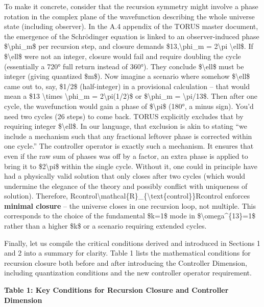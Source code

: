 \documentclass[]{article}
\begin{document}
{{To make it concrete, consider that the recursion symmetry might involve
a phase rotation in the complex plane of the wavefunction describing the
whole universe state (including observer). In the A.4 appendix of the
TORUS master document, the emergence of the Schrödinger equation is
linked to an observer-induced phase \$\textbackslash{}phi\_m\$ per
recursion step, and closure demands \$13,\textbackslash{}phi\_m =
2\textbackslash{}pi \textbackslash{}ell\$​. If \$\textbackslash{}ell\$
were not an integer, closure would fail and require doubling the cycle
(essentially a 720° full return instead of 360°)​. They conclude
\$\textbackslash{}ell\$ must be integer (giving quantized \$m\$)​. Now
imagine a scenario where somehow \$\textbackslash{}ell\$ came out to,
say, \$1/2\$ (half-integer) in a provisional calculation -- that would
mean a \$13 \textbackslash{}times \textbackslash{}phi\_m =
2\textbackslash{}pi(1/2)\$ or \$\textbackslash{}phi\_m =
\textbackslash{}pi/13\$. Then after one cycle, the wavefunction would
gain a phase of \$\textbackslash{}pi\$ (180°, a minus sign). You'd need
two cycles (26 steps) to come back. TORUS explicitly excludes that by
requiring integer \$\textbackslash{}ell\$​. In our language, that
exclusion is akin to stating ``we include a mechanism such that any
fractional leftover phase is corrected within one cycle.'' The
controller operator is exactly such a mechanism. It ensures that even if
the raw sum of phases was off by a factor, an extra phase is applied to
bring it to \$2\textbackslash{}pi\$ within the single cycle. Without it,
one could in principle have had a physically valid solution that only
closes after two cycles (which would undermine the elegance of the
theory and possibly conflict with uniqueness of solution). Therefore,
Rcontrol\textbackslash{}mathcal\{R\}\_\{\textbackslash{}text\{control\}\}Rcontrol​
enforces \textbf{minimal closure} -- the universe closes in one
recursion loop, not multiple. This corresponds to the choice of the
fundamental \$k=1\$ mode in \$\textbackslash{}omega\^{}\{13\}=1\$ rather
than a higher \$k\$ or a scenario requiring extended cycles​.

Finally, let us compile the critical conditions derived and introduced
in Sections 1 and 2 into a summary for clarity. Table 1 lists the
mathematical conditions for recursion closure both before and after
introducing the Controller Dimension, including quantization conditions
and the new controller operator requirement.

\textbf{Table 1: Key Conditions for Recursion Closure and Controller
Dimension}

}}
\end{document}
